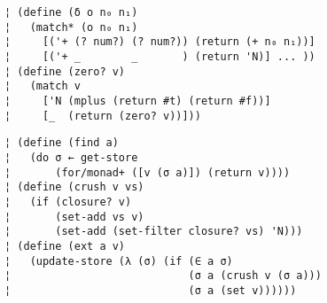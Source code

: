 \begin{figure} %
\begin{mdframed}
\begin{lstlisting}
¦ (define (δ o n₀ n₁)
¦   (match* (o n₀ n₁)
¦     [('+ (? num?) (? num?)) (return (+ n₀ n₁))]
¦     [('+ _        _       ) (return 'N)] ... ))
¦ (define (zero? v)
¦   (match v
¦     ['N (mplus (return #t) (return #f))]
¦     [_  (return (zero? v))]))
\end{lstlisting}
\figskip{}
\begin{lstlisting}
¦ (define (find a)
¦   (do σ ← get-store
¦       (for/monad+ ([v (σ a)]) (return v))))
¦ (define (crush v vs)
¦   (if (closure? v)
¦       (set-add vs v)
¦       (set-add (set-filter closure? vs) 'N)))
¦ (define (ext a v)
¦   (update-store (λ (σ) (if (∈ a σ)
¦                            (σ a (crush v (σ a)))
¦                            (σ a (set v))))))
\end{lstlisting}
\label{f:pres-delta}
\end{mdframed}
\end{figure} %
